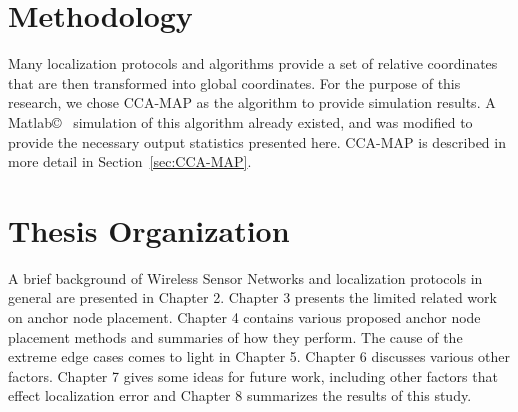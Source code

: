 \section{Methodology}
Many localization protocols and algorithms provide a set of relative coordinates that are then transformed into global coordinates.  For the purpose of this research, we chose CCA-MAP\cite{CCA-MAP07,CCA-MAP09} as the algorithm to provide simulation results.  A Matlab\copyright~  simulation of this algorithm already existed\cite{CCA-MAP07}, and was modified to provide the necessary output statistics presented here.  CCA-MAP is described in more detail in Section~\ref{sec:CCA-MAP}.

\section{Thesis Organization}
A brief background of Wireless Sensor Networks and localization protocols in general are presented in Chapter 2.  Chapter 3 presents the limited related work on anchor node placement.  Chapter 4 contains various proposed anchor node placement methods and summaries of how they perform.  The cause of the extreme edge cases comes to light in Chapter 5.  Chapter 6 discusses various other factors. Chapter 7 gives some ideas for future work, including other factors that effect localization error and Chapter 8 summarizes the results of this study.

